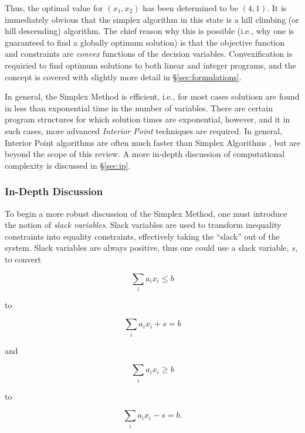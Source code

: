 Thus, the optimal value for $(x_1, x_2)$ has been determined to be $(4, 1)$. It
is immediately obvious that the simplex algorithm in this state is a hill
climbing (or hill descending) algorithm. The chief reason why this is possible
(i.e., why one is guaranteed to find a globally optimum solution) is that the
objective function and constraints are \textit{convex} functions of the decision
variables. Convexification is requiried to find optimum solutions to both linear
and integer programs, and the concept is covered with slightly more detail
in \S \ref{sec:formulations}.

In general, the Simplex Method is efficient, i.e., for most cases solutiosn are
found in less than exponential time in the number of variables. There are
certain program structures for which solution times are exponential, however,
and it in such cases, more advanced \textit{Interior Point} techniques are
required. In general, Interior Point algorithms are often much faster than
Simplex Algorithms \cite{ferris_linear_2008}, but are beyond the scope of this
review. A more in-depth discussion of computational complexity is discussed
in \S \ref{sec:ip}.

\subsubsection{In-Depth Discussion}
To begin a more robust discussion of the Simplex Method, one must introduce the
notion of \textit{slack variables}. Slack variables are used to transform
inequality constraints into equality constraints, effectively taking the
``slack'' out of the system. Slack variables are always positive, thus one could
use a slack variable, $s$, to convert

\begin{equation}
  \sum_{i} a_i x_i \leq b
\end{equation}

to 

\begin{equation}
  \sum_{i} a_i x_i + s = b
\end{equation}

and

\begin{equation}
  \sum_{i} a_i x_i \geq b
\end{equation}

to 

\begin{equation}
  \sum_{i} a_i x_i - s = b.
\end{equation}

